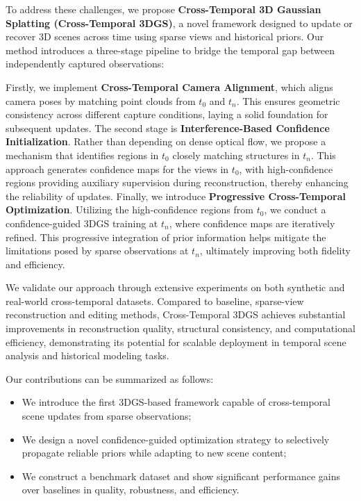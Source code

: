 \documentclass[letterpaper]{article} %
\begin{document}
To address these challenges, we propose \textbf{Cross-Temporal 3D Gaussian Splatting (Cross-Temporal 3DGS)}, a novel framework designed to update or recover 3D scenes across time using sparse views and historical priors. Our method introduces a three-stage pipeline to bridge the temporal gap between independently captured observations:

%
Firstly, we implement \textbf{Cross-Temporal Camera Alignment}, which aligns camera poses by matching point clouds from \( t_0 \) and \( t_n \). This ensures geometric consistency across different capture conditions, laying a solid foundation for subsequent updates. 
%
The second stage is \textbf{Interference-Based Confidence Initialization}. Rather than depending on dense optical flow, we propose a mechanism that identifies regions in \( t_0 \) closely matching structures in \( t_n \). This approach generates confidence maps for the views in \( t_0 \), with high-confidence regions providing auxiliary supervision during reconstruction, thereby enhancing the reliability of updates.
%
Finally, we introduce \textbf{Progressive Cross-Temporal Optimization}. Utilizing the high-confidence regions from \( t_0 \), we conduct a confidence-guided 3DGS training at \( t_n \), where confidence maps are iteratively refined. This progressive integration of prior information helps mitigate the limitations posed by sparse observations at \( t_n \), ultimately improving both fidelity and efficiency.

We validate our approach through extensive experiments on both synthetic and real-world cross-temporal datasets. Compared to baseline, sparse-view reconstruction and editing methods, Cross-Temporal 3DGS achieves substantial improvements in reconstruction quality, structural consistency, and computational efficiency, demonstrating its potential for scalable deployment in temporal scene analysis and historical modeling tasks.

Our contributions can be summarized as follows:

\begin{itemize}
\item We introduce the first 3DGS-based framework capable of cross-temporal scene updates from sparse observations;
\item  We design a novel confidence-guided optimization strategy to selectively propagate reliable priors while adapting to new scene content;
\item We construct a benchmark dataset and show significant performance gains over baselines in quality, robustness, and efficiency.
\end{itemize}
\end{document}
